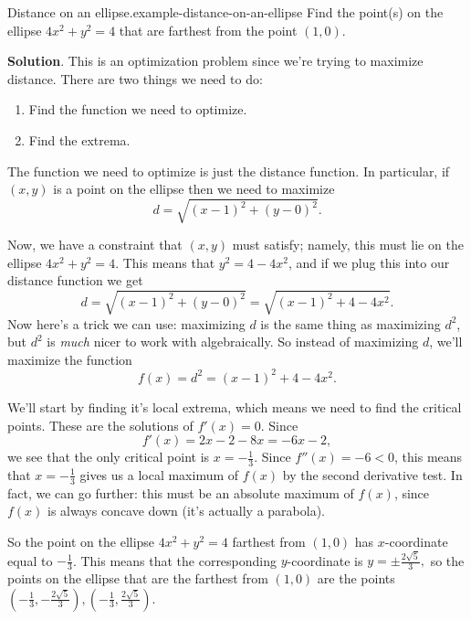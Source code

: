 \documentclass[10pt,]{book}
\numberwithin{equation}{section}
\begin{document}
\begin{example}{Distance on an ellipse.}{example-distance-on-an-ellipse}%
\hypertarget{p-361}{}%
Find the point(s) on the ellipse \(4x^{2} + y^{2} = 4\) that are farthest from the point \((1,0)\).%
\par\smallskip%
\noindent\textbf{Solution}.\hypertarget{solution-80}{}\quad%
\hypertarget{p-362}{}%
This is an optimization problem since we're trying to maximize distance. There are two things we need to do: \leavevmode%
\begin{enumerate}
\item\hypertarget{li-26}{}Find the function we need to optimize.%
\item\hypertarget{li-27}{}Find the extrema.%
\end{enumerate}
 The function we need to optimize is just the distance function. In particular, if \((x,y)\) is a point on the ellipse then we need to maximize%
\begin{equation*}
d = \sqrt{(x-1)^{2} + (y-0)^{2}}.
\end{equation*}
%
\par
\hypertarget{p-363}{}%
Now, we have a constraint that \((x,y)\) must satisfy; namely, this must lie on the ellipse \(4x^{2} + y^{2} = 4\). This means that \(y^{2} = 4 - 4x^{2}\), and if we plug this into our distance function we get%
\begin{equation*}
d = \sqrt{(x-1)^{2} + (y-0)^{2}} = \sqrt{(x-1)^{2} + 4 - 4x^{2}}.
\end{equation*}
Now here's a trick we can use: maximizing \(d\) is the same thing as maximizing \(d^{2}\), but \(d^{2}\) is \emph{much} nicer to work with algebraically. So instead of maximizing \(d\), we'll maximize the function%
\begin{equation*}
f(x) = d^{2} = (x-1)^{2} + 4 - 4x^{2}.
\end{equation*}
%
\par
\hypertarget{p-364}{}%
We'll start by finding it's local extrema, which means we need to find the critical points. These are the solutions of \(f'(x) = 0\). Since%
\begin{equation*}
f'(x) = 2x - 2 - 8x = -6x - 2,
\end{equation*}
we see that the only critical point is \(x = -\frac{1}{3}\). Since \(f''(x) = -6 < 0\), this means that \(x = -\frac{1}{3}\) gives us a local maximum of \(f(x)\) by the second derivative test. In fact, we can go further: this must be an absolute maximum of \(f(x)\), since \(f(x)\) is always concave down (it's actually a parabola).%
\par
\hypertarget{p-365}{}%
So the point on the ellipse \(4x^{2} + y^{2} = 4\) farthest from \((1,0)\) has \(x\)-coordinate equal to \(-\frac{1}{3}\). This means that the corresponding \(y\)-coordinate is \(y = \pm\frac{2\sqrt{5}}{3},\) so the points on the ellipse that are the farthest from \((1,0)\) are the points \((-\frac{1}{3}, -\frac{2\sqrt{5}}{3}), (-\frac{1}{3}, \frac{2\sqrt{5}}{3}).\)%
\end{example}
%
%
\typeout{************************************************}
\typeout{************************************************}
%
\end{document}
